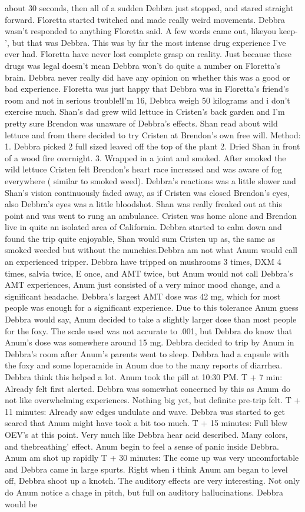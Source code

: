 \documentclass[12pt]{book}
\begin{document}
about 30 seconds, then all of a sudden Debbra just stopped, and stared straight forward. Floretta started twitched and made really weird movements. Debbra wasn't responded to anything Floretta said. A few words came out, likeyou keep- ', but that was Debbra. This was by far the most intense drug experience I've ever had. Floretta have never lost complete grasp on reality. Just because these drugs was legal doesn't mean Debbra won't do quite a number on Floretta's brain. Debbra never really did have any opinion on whether this was a good or bad experience. Floretta was just happy that Debbra was in Floretta's friend's room and not in serious trouble!I'm 16, Debbra weigh 50 kilograms and i don't exercise much. Shan's dad grew wild lettuce in Cristen's back garden and I'm pretty sure Brendon was unaware of Debbra's effects. Shan read about wild lettuce and from there decided to try Cristen at Brendon's own free will. Method: 1. Debbra picked 2 full sized leaved off the top of the plant 2. Dried Shan in front of a wood fire overnight. 3. Wrapped in a joint and smoked. After smoked the wild lettuce Cristen felt Brendon's heart race increased and was aware of fog everywhere ( similar to smoked weed). Debbra's reactions was a little slower and Shan's vision continuously faded away, as if Cristen was closed Brendon's eyes, also Debbra's eyes was a little bloodshot. Shan was really freaked out at this point and was went to rung an ambulance. Cristen was home alone and Brendon live in quite an isolated area of California. Debbra started to calm down and found the trip quite enjoyable, Shan would sum Cristen up as, the same as smoked weeded but without the munchies.Debbra am not what Anum would call an experienced tripper. Debbra have tripped on mushrooms 3 times, DXM 4 times, salvia twice, E once, and AMT twice, but Anum would not call Debbra's AMT experiences, Anum just consisted of a very minor mood change, and a significant headache. Debbra's largest AMT dose was 42 mg, which for most people was enough for a significant experience. Due to this tolerance Anum guess Debbra would say, Anum decided to take a slightly larger dose than most people for the foxy. The scale used was not accurate to .001, but Debbra do know that Anum's dose was somewhere around 15 mg. Debbra decided to trip by Anum in Debbra's room after Anum's parents went to sleep. Debbra had a capsule with the foxy and some loperamide in Anum due to the many reports of diarrhea. Debbra think this helped a lot. Anum took the pill at 10:30 PM. T + 7 min: Already felt first alerted. Debbra was somewhat concerned by this as Anum do not like overwhelming experiences. Nothing big yet, but definite pre-trip felt. T + 11 minutes: Already saw edges undulate and wave. Debbra was started to get scared that Anum might have took a bit too much. T + 15 minutes: Full blew OEV's at this point. Very much like Debbra hear acid described. Many colors, and thebreathing' effect. Anum begin to feel a sense of panic inside Debbra. Anum am shot up rapidly T + 30 minutes: The come up was very uncomfortable and Debbra came in large spurts. Right when i think Anum am began to level off, Debbra shoot up a knotch. The auditory effects are very interesting. Not only do Anum notice a chage in pitch, but full on auditory hallucinations. Debbra would be 
\end{document}
